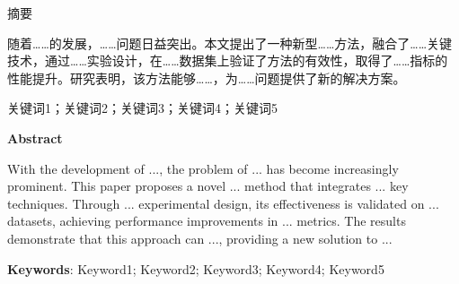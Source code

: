 \cleardoublepage{}
\begin{center}
    \heiti{} 摘要
\end{center}

随着……的发展，……问题日益突出。本文提出了一种新型……方法，融合了……关键技术，通过……实验设计，在……数据集上验证了方法的有效性，取得了……指标的性能提升。研究表明，该方法能够……，为……问题提供了新的解决方案。

\vspace{\baselineskip}
关键词1；关键词2；关键词3；关键词4；关键词5

\cleardoublepage{}
\begin{center}
    \Arial{} \textbf{Abstract}
\end{center}

With the development of ..., the problem of ... has become increasingly prominent.
This paper proposes a novel ... method that integrates ... key techniques.
Through ... experimental design, its effectiveness is validated on ... datasets,
achieving performance improvements in ... metrics.
The results demonstrate that this approach can ..., providing a new solution to ...

\vspace{\baselineskip}
\noindent\textbf{Keywords}: Keyword1; Keyword2; Keyword3; Keyword4; Keyword5
